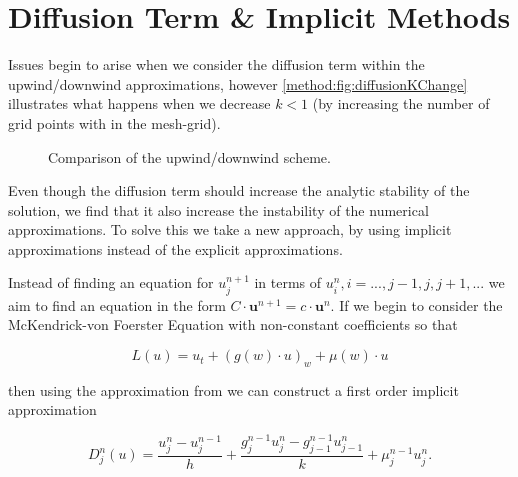 \documentclass[../main.tex]{subfiles}
\begin{document}
  \section{Diffusion Term \& Implicit Methods}
  Issues begin to arise when we consider the diffusion term within the upwind/downwind approximations, however \autoref{method:fig:diffusionKChange} illustrates what happens when we decrease $k < 1$ (by increasing the number of grid points with in the mesh-grid).

  \begin{figure}[htb]
    \centering
    \caption{\label{method:fig:diffusionKChange} Comparison of the upwind/downwind scheme.}
  \end{figure}

  Even though the diffusion term should increase the analytic stability of the solution, we find that it also increase the instability of the numerical approximations. To solve this we take a new approach, by using implicit approximations instead of the explicit approximations.

  Instead of finding an equation for $u^{n+1}_j$ in terms of $u^n_i, i = ..., j-1, j, j+1, ... $ we aim to find an equation in the form $C \cdot \textbf{u}^{n+1} = c \cdot \textbf{u}^n$. If we begin to consider the McKendrick-von Foerster Equation with non-constant coefficients so that

  \begin{equation}
    L(u) = u_t + (g(w) \cdot u)_w + \mu(w) \cdot u
  \end{equation}

  then using the approximation from \cite{hartvig2011} we can construct a first order implicit approximation

  \begin{equation}
    D^n_j(u) = \frac{u^n_j - u^{n-1}_j}{h} + \frac{g^{n-1}_j u^n_j - g^{n-1}_{j-1} u^n_{j-1}}{k} + \mu^{n-1}_j u^n_j.
  \end{equation}
\end{document}
